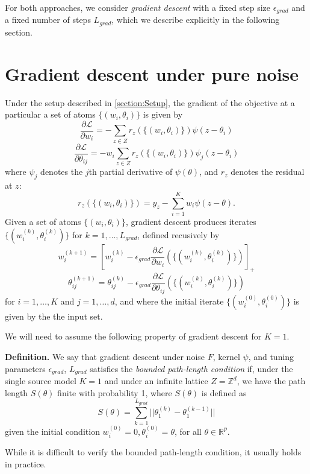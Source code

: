 \documentclass[11pt]{article}
\begin{document}
For both approaches, we consider \emph{gradient descent} with a fixed
step size $\epsilon_{grad}$ and a fixed number of steps $L_{grad}$, which we
describe explicitly in the following section.

\section{Gradient descent under pure noise}

Under the setup described in \ref{section:Setup},
the gradient of the objective at a particular a set of atoms $\{(w_i, \theta_i)\}$
is given by
\[
\frac{\partial \mathcal{L}}{\partial w_i} = -\sum_{z \in Z} r_z(\{(w_i, \theta_i)\}) \psi(z - \theta_i)
\]
\[
\frac{\partial \mathcal{L}}{\partial \theta_{ij}} = -w_i\sum_{z \in Z} r_z(\{(w_i, \theta_i)\}) \psi_j(z - \theta_i)
\]
where $\psi_j$ denotes the $j$th partial derivative of $\psi(\theta)$, and $r_z$ denotes the residual at $z$:
\[
r_z(\{(w_i, \theta_i)\}) = y_z - \sum_{i=1}^K w_i \psi(z - \theta).
\]
Given a set of atoms $\{(w_i, \theta_i)\}$, gradient descent produces iterates
$\{(w_i^{(k)}, \theta_i^{(k)})\}$ for $k = 1,\hdots, L_{grad}$,
defined recusively by
\[
w_i^{(k + 1)} = \left[w_i^{(k)} - \epsilon_{grad} \frac{\partial \mathcal{L}}{\partial w_i}(\{(w_i^{(k)}, \theta_i^{(k)})\})\right]_+
\]
\[
\theta_{ij}^{(k + 1)} = \theta_{ij}^{(k)} - \epsilon_{grad} \frac{\partial \mathcal{L}}{\partial \theta_{ij}}(\{(w_i^{(k)}, \theta_i^{(k)})\})
\]
for $i = 1,\hdots, K$ and $j=1,\hdots, d$, and where the initial iterate $\{(w_i^{(0)},
\theta_i^{(0)})\}$ is given by the the input set.

We will need to assume the following property of gradient descent for $K=1$.


\textbf{Definition. } 
We say that gradient descent under noise $F$, kernel $\psi$, and
tuning parameters $\epsilon_{grad}$, $L_{grad}$ satisfies the
\emph{bounded path-length condition} if, under the single source model
$K=1$ and under an infinite lattice $Z = \mathbb{Z}^d$, we have the
path length $S(\theta)$ finite with probability 1, where $S(\theta)$ is defined as
\[
S(\theta) = \sum_{k=1}^{L_{grad}} ||\theta_1^{(k)} - \theta_1^{(k - 1)}||
\]
given the initial condition $w_i^{(0)} = 0, \theta_i^{(0)} = \theta$,
for all $\theta \in \mathbb{R}^p$.


While it is difficult to verify the bounded path-length condition, it
usually holds in practice.
\end{document}
